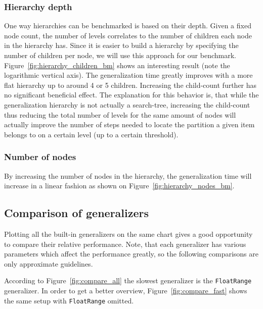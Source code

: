 \subsubsection{Hierarchy depth}
One way hierarchies can be benchmarked is based on their depth. Given a fixed node count, the number of levels correlates to the number of children each node in the hierarchy has. Since it is easier to build a hierarchy by specifying the number of children per node, we will use this approach for our benchmark. Figure~\ref{fig:hierarchy_children_bm} shows an interesting result (note the logarithmic vertical axis). The generalization time greatly improves with a more flat hierarchy up to around 4 or 5 children. Increasing the child-count further has no significant beneficial effect. The explanation for this behavior is, that while the generalization hierarchy is not actually a search-tree, increasing the child-count thus reducing the total number of levels for the same amount of nodes will actually improve the number of steps needed to locate the partition a given item belongs to on a certain level (up to a certain threshold).
\vspace{\baselineskip}


\subsubsection{Number of nodes}
By increasing the number of nodes in the hierarchy, the generalization time will increase in a linear fashion as shown on Figure~\ref{fig:hierarchy_nodes_bm}.
\vspace{\baselineskip}


\subsection{Comparison of generalizers}

Plotting all the built-in generalizers on the same chart gives a good opportunity to compare their relative performance. Note, that each generalizer has various parameters which affect the performance greatly, so the following comparisons are only approximate guidelines.

According to Figure~\ref{fig:compare_all} the slowest generalizer is the \texttt{FloatRange} generalizer. In order to get a better overview, Figure~\ref{fig:compare_fast} shows the same setup with \texttt{FloatRange} omitted.

